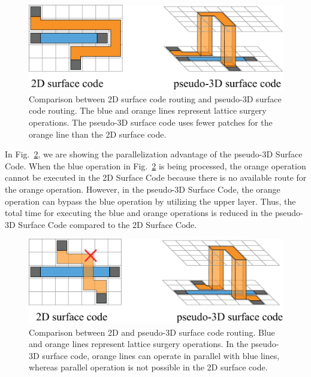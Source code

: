 \documentclass[a4paper,11pt]{ltjsarticle}
\begin{document}
{{        \begin{figure}[h]
            \centering
            \includegraphics[scale=0.25]{figure/3D_advantage_distance.eps}
            \vspace{10pt}\caption{Comparison between 2D surface code routing and pseudo-3D surface code routing. The blue and orange lines represent lattice surgery operations. The pseudo-3D surface code uses fewer patches for the orange line than the 2D surface code.}
            \label{3D_advantage_distance}
            \vspace{-10pt}
        \end{figure}
        \clearpage
        In Fig.~\ref{3D_advantage_parallel}, we are showing the parallelization advantage of the pseudo-3D Surface Code. When the blue operation in Fig.~\ref{3D_advantage_parallel} is being processed, the orange operation cannot be executed in the 2D Surface Code because there is no available route for the orange operation. However, in the pseudo-3D Surface Code, the orange operation can bypass the blue operation by utilizing the upper layer. Thus, the total time for executing the blue and orange operations is reduced in the pseudo-3D Surface Code compared to the 2D Surface Code.

        \begin{figure}[h]
            \centering
            \includegraphics[scale=0.25]{figure/3D_advantage_parallel.eps}
            \vspace{10pt}\caption{Comparison between 2D and pseudo-3D surface code routing. Blue and orange lines represent lattice surgery operations. In the pseudo-3D surface code, orange lines can operate in parallel with blue lines, whereas parallel operation is not possible in the 2D surface code. }
            \label{3D_advantage_parallel}
            \vspace{-10pt}
        \end{figure}
    }
}
\end{document}
